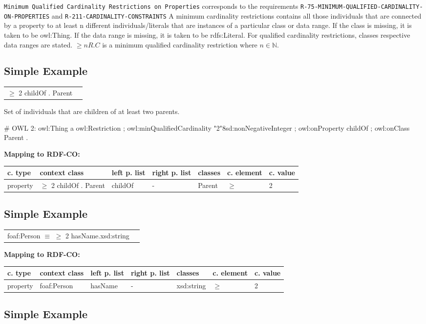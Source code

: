 \documentclass{llncs}
\newcommand{\ms}[1]{\texttt{#1}}
\newenvironment{gcotable}{
  \scriptsize
  \sffamily
  \vspace{0cm}
	\begin{center}
	\textbf{\vspace{0.4cm}Mapping to RDF-CO:} \\
  \begin{tabular}{l|l|l|l|l|l|l}
	\hline
  \textbf{c. type} & \textbf{context class} & \textbf{left p. list} & \textbf{right p. list} & \textbf{classes} & \textbf{c. element} & \textbf{c. value} \\
  \hline

}{
  \hline
  \end{tabular}
	\end{center}
}
\newenvironment{DL}{
  \vspace{0cm}
	\begin{center}
  \begin{tabular}{r l}

}{
  \end{tabular}
	\end{center}
}
\begin{document}
\ms{Minimum Qualified Cardinality Restrictions on Properties} corresponds to the requirements
\ms{R-75-MINIMUM-QUALIFIED-CARDINALITY-ON-PROPERTIES} and \ms{R-211-CARDINALITY-CONSTRAINTS}
A minimum cardinality restrictions contains all those individuals that are connected by a property to at least n different individuals/literals 
that are instances of a particular class or data range. If the class is missing, it is taken to be owl:Thing. 
If the data range is missing, it is taken to be rdfs:Literal.
For qualified cardinality restrictions, classes respective data ranges are stated.
$\geq n R. C$ is a minimum qualified cardinality restriction where $n \in \mathbb{N}$.

\subsection{Simple Example}

\begin{DL}
$\geq$ 2 childOf . Parent
\end{DL}

Set of individuals that are children of at least two parents.

\begin{ex}
# OWL 2:
owl:Thing
    a owl:Restriction ;
    owl:minQualifiedCardinality "2"^^xsd:nonNegativeInteger ;
    owl:onProperty childOf ;
    owl:onClass Parent .
\end{ex}

\begin{gcotable}
property & $\geq$ 2 childOf . Parent & childOf & -  & Parent & $\geq$ & 2 \\
\end{gcotable}

\subsection{Simple Example}

\begin{DL}
foaf:Person $\equiv$ $\geq$ 2 hasName.xsd:string
\end{DL}

\begin{gcotable}
property & foaf:Person & hasName & - & xsd:string & $\geq$ & 2 \\
\end{gcotable}

\subsection{Simple Example}
\end{document}
